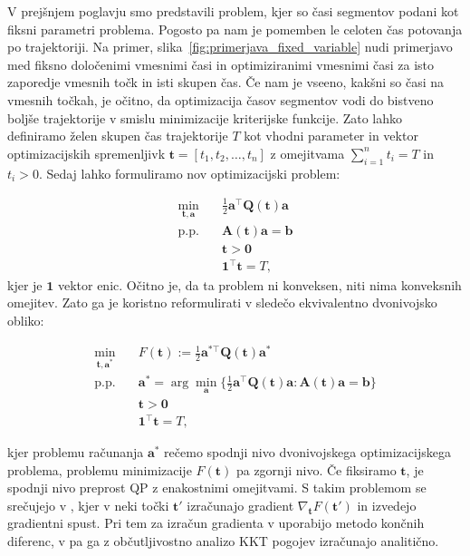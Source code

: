 \documentclass[isrm2, tisk]{fmfdelo}
\begin{document}
V prejšnjem poglavju smo predstavili problem, kjer so časi segmentov podani kot fiksni parametri problema. Pogosto pa nam je pomemben le celoten čas potovanja po trajektoriji. Na primer, slika~\ref{fig:primerjava_fixed_variable} nudi primerjavo med fiksno določenimi vmesnimi časi in optimiziranimi vmesnimi časi za isto zaporedje vmesnih točk in isti skupen čas. Če nam je vseeno, kakšni so časi na vmesnih točkah, je očitno, da optimizacija časov segmentov vodi do bistveno boljše trajektorije v smislu minimizacije kriterijske funkcije. Zato lahko definiramo želen skupen čas trajektorije $T$ kot vhodni parameter in vektor optimizacijskih spremenljivk $\mathbf{t} = \left[ t_1, t_2, \ldots , t_n\right]$ z omejitvama $\sum_{i=1}^n t_i = T$ in $t_i > 0$.  Sedaj lahko formuliramo nov optimizacijski problem:

\begin{equation}
    \begin{aligned}
        \min_{\mathbf{t},\mathbf{a}} & \quad \frac{1}{2}\mathbf{a}^\top \mathbf{Q}(\mathbf{t}) \mathbf{a}\\
        \text{p.p.} & \quad \mathbf{A}(\mathbf{t})\mathbf{a} = \mathbf{b}\\
        & \quad \mathbf{t} > \mathbf{0} \\
        & \quad \mathbf{1}^\top \mathbf{t} = T,
    \end{aligned}
\end{equation}
kjer je $\mathbf{1}$ vektor enic. Očitno je, da ta problem ni konveksen, niti nima konveksnih omejitev. Zato ga je koristno reformulirati v sledečo ekvivalentno dvonivojsko obliko:

\begin{equation}
    \label{eq:bilevel}
    \begin{aligned}
        \min_{\mathbf{t},\mathbf{a^*}}& \quad F(\mathbf{t}) := \frac{1}{2}\mathbf{a^{*\top}}\mathbf{Q}(\mathbf{t})\mathbf{a^*} \\
        \text{p.p.}& \quad\mathbf{a^*} = \arg \min_\mathbf{a} \{\frac{1}{2}\mathbf{a}^\top\mathbf{Q}(\mathbf{t})\mathbf{a} : \mathbf{A}(\mathbf{t})\mathbf{a} = \mathbf{b}\}\\
        & \quad \mathbf{t} > \mathbf{0} \\
        & \quad \mathbf{1}^\top \mathbf{t} = T,
    \end{aligned}
\end{equation}

\noindent kjer problemu računanja $\mathbf{a}^*$ rečemo spodnji nivo dvonivojskega optimizacijskega problema, problemu minimizacije $F(\mathbf{t})$ pa zgornji nivo. Če fiksiramo $\mathbf{t}$, je spodnji nivo preprost QP z enakostnimi omejitvami. S takim problemom se srečujejo v \cite{mellinger2011minimum, sun2021fast}, kjer v neki točki $\mathbf{t}'$ izračunajo gradient $\nabla_\mathbf{t}F(\mathbf{t}')$ in izvedejo gradientni spust. Pri tem za izračun gradienta v \cite{mellinger2011minimum} uporabijo metodo končnih diferenc, v \cite{sun2021fast} pa ga z občutljivostno analizo \ac{KKT} pogojev izračunajo analitično.
\end{document}
